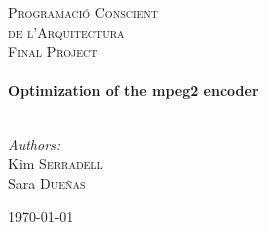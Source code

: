 
\begin{titlepage}
\begin{center}

\bigskip



\textsc{\LARGE Programació Conscient}\\[0.2cm]
\textsc{\LARGE de l'Arquitectura}\\[1.5cm]
\textsc{\Large Final Project}\\[0.5cm]


\HRule \\[0.4cm]
{ \huge \bfseries Optimization of the mpeg2 encoder}\\[0.4cm]

\HRule \\[1.5cm]

\end{center}

\begin{minipage}{0.4\textwidth}
\begin{flushleft} \large
\emph{Authors:}\\
Kim \textsc{Serradell}\\
Sara \textsc{Dueñas}\\
\end{flushleft}
\end{minipage}

\vfill
\begin{center}
{\large \today}
\end{center}


\end{titlepage}
